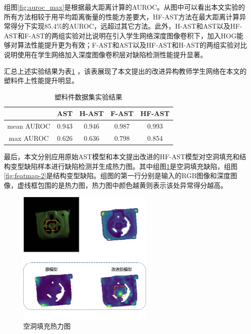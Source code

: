 组图\ref{fig:auroc_max}是根据最大距离计算的AUROC。从图中可以看出本文实验的所有方法相较于用平均距离衡量的性能方差要大，HF-AST方法在最大距离计算异常得分下实现85.4\%的AUROC，远超过其它方法。此外，H-AST和AST以及HF-AST和F-AST的两组实验对比说明在引入学生网络深度图像卷积下，加入HOG能够对算法性能提升更为有效；F-AST和AST以及HF-AST和H-AST的两组实验对比说明使用在学生网络加入深度图像卷积层对缺陷检测性能提升显著。

汇总上述实验结果为表\ref{tab:plastics-experiment} ，该表展现了本文提出的改进异构教师学生网络在本文的塑料件上性能提升明显。
\begin{table}[htbp]
    \centering
    \caption{塑料件数据集实验结果} \label{tab:plastics-experiment}
    \begin{tabular*}{0.8\textwidth}{@{\extracolsep{\fill}}ccccc}
    \toprule
      &AST&H-AST&F-AST&HF-AST\\
      \midrule
      mean AUROC&0.943&0.946&0.987&0.993\\
      max AUROC&0.626&0.636&0.798&0.854\\
    \bottomrule
    \end{tabular*}
\end{table}

最后，本文分别应用原始AST模型和本文提出改进的HF-AST模型对空洞填充和结构变型缺陷样本进行缺陷检测并生成热力图。其中组图\ref{fig:featmap-1}是空洞填充缺陷，组图\ref{fig:featmap-2}是结构变型缺陷。组图的第一行分别是输入的RGB图像和深度图像，虚线框包围的是热力图，热力图中颜色越黄则表示该处异常得分越高。

\begin{figure}[htbp]
    \centering
    \includegraphics[width=0.6\textwidth]{figures/4/featmap-1.png}
    \caption{空洞填充热力图}
    \label{fig:featmap-1}
\end{figure}

